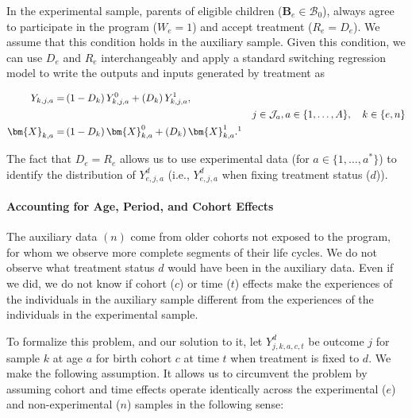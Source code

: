\noindent In the experimental sample, parents of eligible children ($\bm{B}_e \in \mathcal{B}_{0}$), always agree to participate in the program ($W_e = 1$) and accept treatment ($R_e = D_e$). We assume that this condition holds in the auxiliary sample. Given this condition, we can use $D_e$ and $R_e$ interchangeably and apply a standard \citet{Quandt_1972_JASA} switching regression model to write the outputs and inputs generated by treatment as
\begin{spacing}{1}
\begin{align}\label{eq:countersystem}
Y_{k,j,a} =& \left( 1 - D_k \right) Y_{k,j,a}^0 + \left( D_k \right) Y_{k,j,a}^1, \\
&&j \in \mathcal{J}_a, a \in \{1,\dots,A\}, \quad k \in \{e,n\} \nonumber \\
\bm{X}_{k,a} =& \left( 1 - D_k \right) \bm{X}_{k,a}^0 + \left( D_k \right) \bm{X}_{k,a}^1.\nonumber\footnotemark
\end{align}
\end{spacing}
\noindent The fact that $D_e = R_e$ allows us to use experimental data (for $a \in \{1, \dots,a^*\}$) to identify the distribution of $Y_{e,j,a}^d$ (i.e., $Y_{e,j,a}^d$ when fixing treatment status ($d$)).

\paragraph{Accounting for Age, Period, and Cohort Effects} \label{sec:accoutning-age-period-cohort}

\noindent The auxiliary data $(n)$ come from older cohorts not exposed to the program, for whom we observe more complete segments of their life cycles. We do not observe what treatment status $d$ would have been in the auxiliary data. Even if we did, we do not know if cohort ($c$) or time ($t$) effects make the experiences of the individuals in the auxiliary sample different from the experiences of the individuals in the experimental sample.

\noindent To formalize this problem, and our solution to it, let $Y_{j,k,a,c,t}^d$ be outcome $j$ for sample $k$ at age $a$ for birth cohort $c$ at time $t$ when treatment is fixed to $d$. We make the following assumption. It allows us to circumvent the problem by assuming cohort and time effects operate identically across the experimental ($e$) and non-experimental ($n$) samples in the following sense:

